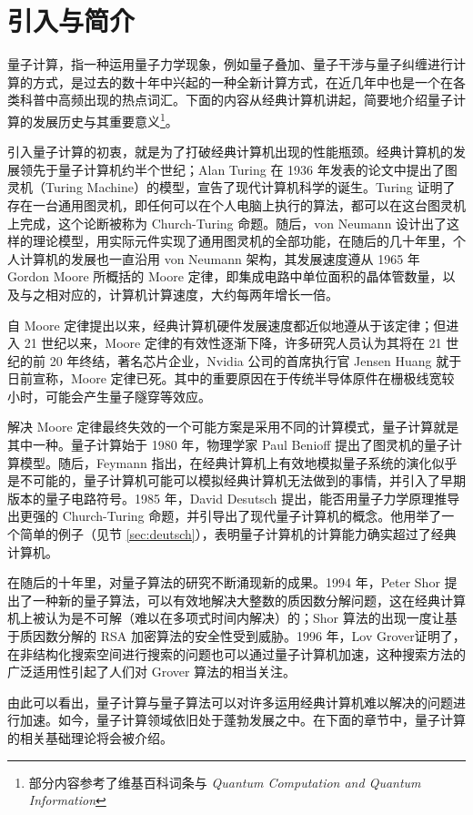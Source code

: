 \section{引入与简介}

量子计算，指一种运用量子力学现象，例如量子叠加、量子干涉与量子纠缠进行计算的方式，是过去的数十年中兴起的一种全新计算方式，在近几年中也是一个在各类科普中高频出现的热点词汇。下面的内容从经典计算机讲起，简要地介绍量子计算的发展历史与其重要意义\footnote{部分内容参考了维基百科词条与 \textit{Quantum Computation and Quantum Information}\cite{nielsen2002quantum}}。

引入量子计算的初衷，就是为了打破经典计算机出现的性能瓶颈。经典计算机的发展领先于量子计算机约半个世纪；Alan Turing 在 1936 年发表的论文中提出了图灵机（Turing Machine）的模型\cite{turing1936computable}，宣告了现代计算机科学的诞生。Turing 证明了存在一台通用图灵机，即任何可以在个人电脑上执行的算法，都可以在这台图灵机上完成，这个论断被称为 Church-Turing 命题。随后，von Neumann 设计出了这样的理论模型，用实际元件实现了通用图灵机的全部功能，在随后的几十年里，个人计算机的发展也一直沿用 von Neumann 架构，其发展速度遵从 1965 年 Gordon Moore 所概括的 Moore 定律，即集成电路中单位面积的晶体管数量，以及与之相对应的，计算机计算速度，大约每两年增长一倍\cite{moore1965cramming}。

自 Moore 定律提出以来，经典计算机硬件发展速度都近似地遵从于该定律；但进入 21 世纪以来，Moore 定律的有效性逐渐下降，许多研究人员认为其将在 21 世纪的前 20 年终结，著名芯片企业，Nvidia 公司的首席执行官 Jensen Huang 就于日前宣称，Moore 定律已死\cite{moorelawdead}。其中的重要原因在于传统半导体原件在栅极线宽较小时，可能会产生量子隧穿等效应\cite{kumar2015fundamental}。

解决 Moore 定律最终失效的一个可能方案是采用不同的计算模式，量子计算就是其中一种。量子计算始于 1980 年，物理学家 Paul Benioff 提出了图灵机的量子计算模型\cite{benioff1980computer}。随后，Feymann 指出，在经典计算机上有效地模拟量子系统的演化似乎是不可能的，量子计算机可能可以模拟经典计算机无法做到的事情\cite{feynman1981simulating}，并引入了早期版本的量子电路符号\cite{feynman1986quantum}。1985 年，David Desutsch 提出，能否用量子力学原理推导出更强的 Church-Turing 命题，并引导出了现代量子计算机的概念\cite{deutsch1985quantum}。他用举了一个简单的例子（见节 \ref{sec:deutsch}），表明量子计算机的计算能力确实超过了经典计算机。

在随后的十年里，对量子算法的研究不断涌现新的成果。1994 年，Peter Shor 提出了一种新的量子算法，可以有效地解决大整数的质因数分解问题\cite{shor1994algorithms}，这在经典计算机上被认为是不可解（难以在多项式时间内解决）的；Shor 算法的出现一度让基于质因数分解的 RSA 加密算法的安全性受到威胁\cite{mermin2006breaking}。1996 年，Lov Grover证明了，在非结构化搜索空间进行搜索的问题也可以通过量子计算机加速\cite{grover1996fast}，这种搜索方法的广泛适用性引起了人们对 Grover 算法的相当关注。

由此可以看出，量子计算与量子算法可以对许多运用经典计算机难以解决的问题进行加速。如今，量子计算领域依旧处于蓬勃发展之中。在下面的章节中，量子计算的相关基础理论将会被介绍。